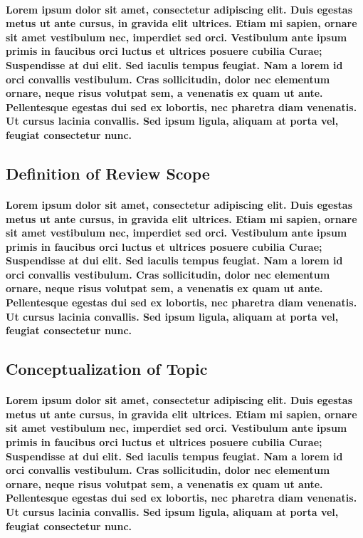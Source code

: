 \documentclass[11pt, twocolumn]{article}
\begin{document}
\paragraph{Lorem ipsum dolor sit amet, consectetur adipiscing elit. Duis egestas metus ut ante cursus, in gravida elit ultrices. Etiam mi sapien, ornare sit amet vestibulum nec, imperdiet sed orci. Vestibulum ante ipsum primis in faucibus orci luctus et ultrices posuere cubilia Curae; Suspendisse at dui elit. Sed iaculis tempus feugiat. Nam a lorem id orci convallis vestibulum. Cras sollicitudin, dolor nec elementum ornare, neque risus volutpat sem, a venenatis ex quam ut ante. Pellentesque egestas dui sed ex lobortis, nec pharetra diam venenatis. Ut cursus lacinia convallis. Sed ipsum ligula, aliquam at porta vel, feugiat consectetur nunc.}

\subsection{Definition of Review Scope}
\paragraph{Lorem ipsum dolor sit amet, consectetur adipiscing elit. Duis egestas metus ut ante cursus, in gravida elit ultrices. Etiam mi sapien, ornare sit amet vestibulum nec, imperdiet sed orci. Vestibulum ante ipsum primis in faucibus orci luctus et ultrices posuere cubilia Curae; Suspendisse at dui elit. Sed iaculis tempus feugiat. Nam a lorem id orci convallis vestibulum. Cras sollicitudin, dolor nec elementum ornare, neque risus volutpat sem, a venenatis ex quam ut ante. Pellentesque egestas dui sed ex lobortis, nec pharetra diam venenatis. Ut cursus lacinia convallis. Sed ipsum ligula, aliquam at porta vel, feugiat consectetur nunc.}

\subsection{Conceptualization of Topic}
\paragraph{Lorem ipsum dolor sit amet, consectetur adipiscing elit. Duis egestas metus ut ante cursus, in gravida elit ultrices. Etiam mi sapien, ornare sit amet vestibulum nec, imperdiet sed orci. Vestibulum ante ipsum primis in faucibus orci luctus et ultrices posuere cubilia Curae; Suspendisse at dui elit. Sed iaculis tempus feugiat. Nam a lorem id orci convallis vestibulum. Cras sollicitudin, dolor nec elementum ornare, neque risus volutpat sem, a venenatis ex quam ut ante. Pellentesque egestas dui sed ex lobortis, nec pharetra diam venenatis. Ut cursus lacinia convallis. Sed ipsum ligula, aliquam at porta vel, feugiat consectetur nunc.}
\end{document}
